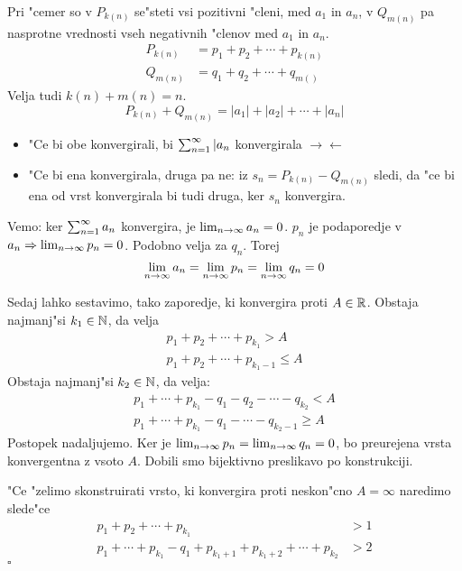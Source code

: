 Pri "cemer so v $P_{k(n)}$ se"steti vsi pozitivni "cleni, med $a_1$ in $a_n$, v $Q_{m(n)}$ pa nasprotne vrednosti vseh negativnih "clenov med $a_1$ in $a_n$.
\begin{align*}
P_{k(n)} &= p_1 + p_2 + \cdots + p_{k(n)} \\
Q_{m(n)} &= q_1 + q_2 + \cdots + q_{m()}
\end{align*}
Velja tudi $k(n) + m(n) = n$.
\begin{equation*}
P_{k(n)} + Q_{m(n)} = |a_1| + |a_2| + \cdots + |a_n|
\end{equation*}
\begin{itemize}
	\item "Ce bi obe konvergirali, bi $\sum_{n = 1}^{\infty}|a_n$ konvergirala $\rightarrow \leftarrow$
	\item "Ce bi ena konvergirala, druga pa ne: iz $s_n = P_{k(n)} - Q_{m(n)}$ sledi, da "ce bi ena od vrst konvergirala bi tudi druga, ker $s_n$ konvergira.
\end{itemize}

Vemo: ker $\sum_{n = 1}^{\infty}a_n$ konvergira, je $\lim_{n \rightarrow \infty} a_n = 0$. $p_n$ je podaporedje v $a_n \Rightarrow \lim_{n \rightarrow \infty} p_n = 0$. Podobno velja za $q_n$. Torej
\begin{equation*}
\lim_{n \rightarrow \infty} a_n = \lim_{n \rightarrow \infty} p_n = \lim_{n \rightarrow \infty} q_n = 0
\end{equation*}

Sedaj lahko sestavimo, tako zaporedje, ki konvergira proti $A \in \mathbb{R}$. Obstaja najmanj"si $k_1 \in \mathbb{N}$, da velja
\begin{gather*}
p_1 + p_2 + \cdots + p_{k_1} > A \\
p_1 + p_2 + \cdots + p_{k_1 - 1} \leq A
\end{gather*}
Obstaja najmanj"si $k_2 \in \mathbb{N}$, da velja:
\begin{gather*}
p_1 + \cdots + p_{k_1} - q_1 - q_2 - \cdots - q_{k_2} < A \\
p_1 + \cdots + p_{k_1} - q_1 - \cdots - q_{k_2-1} \geq A
\end{gather*}
Postopek nadaljujemo. Ker je $\lim_{n \rightarrow \infty} p_n = \lim_{n \rightarrow \infty} q_n = 0$, bo preurejena vrsta konvergentna z vsoto $A$. Dobili smo bijektivno preslikavo po konstrukciji.

"Ce "zelimo skonstruirati vrsto, ki konvergira proti neskon"cno $A = \infty$ naredimo slede"ce
\begin{align*}
p_1 + p_2 + \cdots + p_{k_1} &> 1 \\
p_1 + \cdots + p_{k_1} - q_1 + p_{k_1+1} + p_{k_1 + 2} + \cdots + p_{k_2} &> 2
\end{align*}
\hfill $\square$

